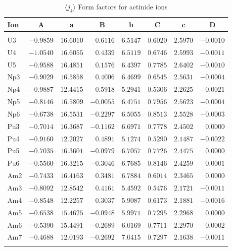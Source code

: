 \begin{table}[H]
\caption{$\langle j_4\rangle$ Form factors for actinide ions}\vspace{2mm}
\label{acj4}
{\tablesize
\begin{tabular}{lrrrrrrr}
\hline
Ion&
\multicolumn{1}{c}{A}&\multicolumn{1}{c}{a}&
\multicolumn{1}{c}{B}&\multicolumn{1}{c}{b}&
\multicolumn{1}{c}{C}&\multicolumn{1}{c}{c}&\multicolumn{1}{c}{D}\\
\hline\\[-2ex]
U3 &$-0.9859$ &$16.6010$ &$0.6116$ &$6.5147$ &$0.6020$ &$2.5970$ &$-0.0010$ \\
U4 &$-1.0540$ &$16.6055$ &$0.4339$ &$6.5119$ &$0.6746$ &$2.5993$ &$-0.0011$ \\
U5 &$-0.9588$ &$16.4851$ &$0.1576$ &$6.4397$ &$0.7785$ &$2.6402$ &$-0.0010$ \\
Np3 &$-0.9029$ &$16.5858$ &$0.4006$ &$6.4699$ &$0.6545$ &$2.5631$ &$-0.0004$ \\
Np4 &$-0.9887$ &$12.4415$ &$0.5918$ &$5.2941$ &$0.5306$ &$2.2625$ &$-0.0021$ \\
Np5 &$-0.8146$ &$16.5809$ &$-0.0055$ &$6.4751$ &$0.7956$ &$2.5623$ &$-0.0004$ \\
Np6 &$-0.6738$ &$16.5531$ &$-0.2297$ &$6.5055$ &$0.8513$ &$2.5528$ &$-0.0003$ \\
Pu3 &$-0.7014$ &$16.3687$ &$-0.1162$ &$6.6971$ &$0.7778$ &$2.4502$ &$0.0000$ \\
Pu4 &$-0.9160$ &$12.2027$ &$0.4891$ &$5.1274$ &$0.5290$ &$2.1487$ &$-0.0022$ \\
Pu5 &$-0.7035$ &$16.3601$ &$-0.0979$ &$6.7057$ &$0.7726$ &$2.4475$ &$0.0000$ \\
Pu6 &$-0.5560$ &$16.3215$ &$-0.3046$ &$6.7685$ &$0.8146$ &$2.4259$ &$0.0001$ \\
Am2 &$-0.7433$ &$16.4163$ &$0.3481$ &$6.7884$ &$0.6014$ &$2.3465$ &$0.0000$ \\
Am3 &$-0.8092$ &$12.8542$ &$0.4161$ &$5.4592$ &$0.5476$ &$2.1721$ &$-0.0011$ \\
Am4 &$-0.8548$ &$12.2257$ &$0.3037$ &$5.9087$ &$0.6173$ &$2.1881$ &$-0.0016$ \\
Am5 &$-0.6538$ &$15.4625$ &$-0.0948$ &$5.9971$ &$0.7295$ &$2.2968$ &$0.0000$ \\
Am6 &$-0.5390$ &$15.4491$ &$-0.2689$ &$6.0169$ &$0.7711$ &$2.2970$ &$0.0002$ \\
Am7 &$-0.4688$ &$12.0193$ &$-0.2692$ &$7.0415$ &$0.7297$ &$2.1638$ &$-0.0011$ \\
\hline\\[-2ex]
\end{tabular}
}
\end{table}
